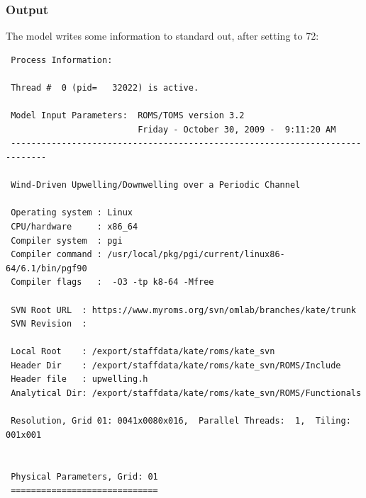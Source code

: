 \subsubsection{Output}
\label{Output}
The model writes some information to standard out, after setting
 to 72:
\begin{verbatim}
 Process Information:

 Thread #  0 (pid=   32022) is active.

 Model Input Parameters:  ROMS/TOMS version 3.2  
                          Friday - October 30, 2009 -  9:11:20 AM
 -----------------------------------------------------------------------------

 Wind-Driven Upwelling/Downwelling over a Periodic Channel

 Operating system : Linux
 CPU/hardware     : x86_64
 Compiler system  : pgi
 Compiler command : /usr/local/pkg/pgi/current/linux86-64/6.1/bin/pgf90
 Compiler flags   :  -O3 -tp k8-64 -Mfree

 SVN Root URL  : https://www.myroms.org/svn/omlab/branches/kate/trunk
 SVN Revision  : 

 Local Root    : /export/staffdata/kate/roms/kate_svn
 Header Dir    : /export/staffdata/kate/roms/kate_svn/ROMS/Include
 Header file   : upwelling.h
 Analytical Dir: /export/staffdata/kate/roms/kate_svn/ROMS/Functionals

 Resolution, Grid 01: 0041x0080x016,  Parallel Threads:  1,  Tiling: 001x001


 Physical Parameters, Grid: 01
 =============================


\end{verbatim}
